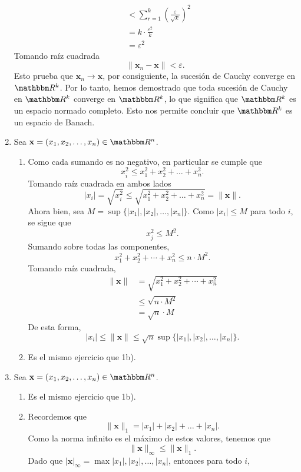 \begin{enumerate}
\begin{align*}
        & < \sum_{r = 1}^{k} \left( \frac{\varepsilon}{\sqrt{k}} \right)^2 \\
        & = k \cdot \frac{\varepsilon^2}{k} \\
        & = \varepsilon^2
    \end{align*}
    Tomando raíz cuadrada
    $$\|\mathbf{x}_n - \mathbf{x}\| < \varepsilon.$$
    Esto prueba que $\mathbf{x}_n \to \mathbf{x}$, por consiguiente, la sucesión de Cauchy converge en $\RR[k]$. Por lo tanto, hemos demostrado que toda sucesión de Cauchy en $\RR[k]$ converge en $\RR[k]$, lo que significa que $\RR[k]$ es un espacio normado completo. Esto nos permite concluir que $\RR[k]$ es un espacio de Banach.
    \item Sea $\mathbf{x} = (x_1, x_2, \dots, x_n) \in \RR[n]$.
    \begin{enumerate}
        \item Como cada sumando es no negativo, en particular se cumple que
        $$x_i^2 \leq x_1^2 + x_2^2 + \dots + x_n^2.$$
        Tomando raíz cuadrada en ambos lados
        $$|x_i| = \sqrt{x_i^2} \leq \sqrt{x_1^2 + x_2^2 + \dots + x_n^2} = \| \mathbf{x} \|.$$
        Ahora bien, sea $M = \sup \{|x_1|, |x_2|, \dots, |x_n|\}$. Como $|x_i| \leq M$ para todo $i$, se sigue que
        $$x_j^2 \leq M^2.$$
        Sumando sobre todas las componentes,
        $$x_1^2 + x_2^2 + \cdots + x_n^2 \leq n \cdot M^2.$$
        Tomando raíz cuadrada,
        \begin{align*}
            \| \mathbf{x} \| & = \sqrt{x_1^2 + x_2^2 + \cdots + x_n^2} \\
            & \leq \sqrt{n \cdot M^2} \\
            & = \sqrt{n} \cdot M
        \end{align*}
        De esta forma,
        $$|x_i| \leq \| \mathbf{x} \| \leq \sqrt{n} \sup \{ |x_1|, |x_2|, \dots, |x_n|\}.$$
        \item Es el mismo ejercicio que 1b).
    \end{enumerate}
    \item Sea $\mathbf{x} = (x_1, x_2, \dots, x_n) \in \RR[n]$.
    \begin{enumerate}
        \item Es el mismo ejercicio que 1b).
        \item Recordemos que
        $$\|\mathbf{x}\|_1 = |x_1| + |x_2| + \dots + |x_n|.$$
        Como la norma infinito es el máximo de estos valores, tenemos que
        $$\|\mathbf{x}\|_{\infty} \leq \|\mathbf{x}\|_1.$$
        Dado que $|\mathbf{x}|_{\infty} = \max {|x_1|, |x_2|, \dots, |x_n|}$, entonces para todo $i$,

\end{enumerate}
\end{enumerate}

